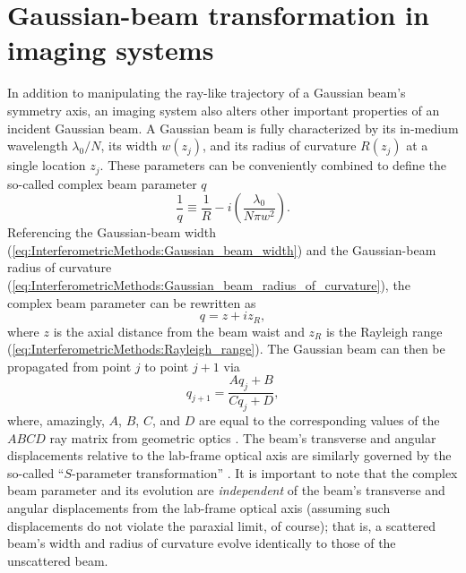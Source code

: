 \section{Gaussian-beam transformation in imaging systems}
\label{sec:ImagingSystems:imaging:Gaussian_beam_transformation}
In addition to manipulating the ray-like trajectory
of a Gaussian beam's symmetry axis,
an imaging system also alters
other important properties of an incident Gaussian beam.
A Gaussian beam is fully characterized by
its in-medium wavelength $\lambda_0 / N$,
its width $w(z_j)$, and
its radius of curvature $R(z_j)$
at a single location $z_j$.
These parameters can be conveniently combined
to define the so-called complex beam parameter $q$
\cite[Sec.~17.1]{siegman_lasers}
\begin{equation}
  \frac{1}{q}
  \equiv
  \frac{1}{R}
  -
  i \left( \frac{\lambda_0}{N \pi w^2} \right).
  \label{eq:ImagingSystems:complex_beam_parameter_inverse}
\end{equation}
Referencing the Gaussian-beam width
(\ref{eq:InterferometricMethods:Gaussian_beam_width}) and
the Gaussian-beam radius of curvature
(\ref{eq:InterferometricMethods:Gaussian_beam_radius_of_curvature}),
the complex beam parameter can be rewritten as
\begin{equation}
  q = z + i z_R,
  \label{eq:ImagingSystems:complex_beam_parameter}
\end{equation}
where $z$ is the axial distance from the beam waist and
$z_R$ is the Rayleigh range (\ref{eq:InterferometricMethods:Rayleigh_range}).
The Gaussian beam can then be propagated from point $j$ to point $j + 1$ via
\begin{equation}
  q_{j+1}
  =
  \frac{A q_j + B}{C q_j + D},
  \label{eq:ImagingSystems:complex_beam_parameter_propagation}
\end{equation}
where, amazingly, $A$, $B$, $C$, and $D$
are equal to the corresponding values
of the $ABCD$ ray matrix from geometric optics
\cite[Sec.~20.2]{siegman_lasers} \cite{tovar_generalized_beam_matrices_IV}.
The beam's transverse and angular displacements
relative to the lab-frame optical axis
are similarly governed by the so-called ``$S$-parameter transformation''
\cite{tovar_generalized_beam_matrices_IV}.
It is important to note that the complex beam parameter and its evolution
are \emph{independent} of the beam's transverse and angular displacements
from the lab-frame optical axis
(assuming such displacements do not violate the paraxial limit, of course);
that is, a scattered beam's width and radius of curvature
evolve identically to those of the unscattered beam.

